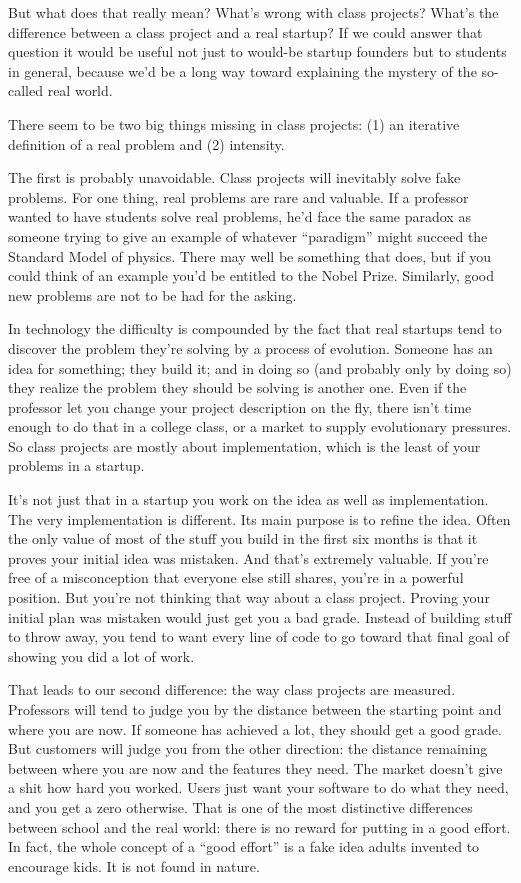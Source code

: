 But what does that really mean? What's wrong with class projects? What's
the difference between a class project and a real startup? If we could
answer that question it would be useful not just to would-be startup
founders but to students in general, because we'd be a long way toward
explaining the mystery of the so-called real world.

There seem to be two big things missing in class projects: (1) an
iterative definition of a real problem and (2) intensity.

The first is probably unavoidable. Class projects will inevitably solve
fake problems. For one thing, real problems are rare and valuable. If a
professor wanted to have students solve real problems, he'd face the
same paradox as someone trying to give an example of whatever
``paradigm'' might succeed the Standard Model of physics. There may well
be something that does, but if you could think of an example you'd be
entitled to the Nobel Prize. Similarly, good new problems are not to be
had for the asking.

In technology the difficulty is compounded by the fact that real
startups tend to discover the problem they're solving by a process of
evolution. Someone has an idea for something; they build it; and in
doing so (and probably only by doing so) they realize the problem they
should be solving is another one. Even if the professor let you change
your project description on the fly, there isn't time enough to do that
in a college class, or a market to supply evolutionary pressures. So
class projects are mostly about implementation, which is the least of
your problems in a startup.

It's not just that in a startup you work on the idea as well as
implementation. The very implementation is different. Its main purpose
is to refine the idea. Often the only value of most of the stuff you
build in the first six months is that it proves your initial idea was
mistaken. And that's extremely valuable. If you're free of a
misconception that everyone else still shares, you're in a powerful
position. But you're not thinking that way about a class project.
Proving your initial plan was mistaken would just get you a bad grade.
Instead of building stuff to throw away, you tend to want every line of
code to go toward that final goal of showing you did a lot of work.

That leads to our second difference: the way class projects are
measured. Professors will tend to judge you by the distance between the
starting point and where you are now. If someone has achieved a lot,
they should get a good grade. But customers will judge you from the
other direction: the distance remaining between where you are now and
the features they need. The market doesn't give a shit how hard you
worked. Users just want your software to do what they need, and you get
a zero otherwise. That is one of the most distinctive differences
between school and the real world: there is no reward for putting in a
good effort. In fact, the whole concept of a ``good effort'' is a fake
idea adults invented to encourage kids. It is not found in nature.

